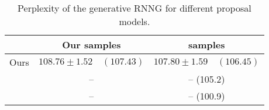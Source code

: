\begin{table}[h]
\center
\footnotesize
  \begin{tabular}{l|c|c}
        & Our samples & \citet{dyer2016rnng} samples \\ \hline
      Ours & $108.76 \pm	1.52 \quad (107.43)$ & $107.80 \pm 1.59 \quad (106.45)$  \\
      \citet{dyer2016rnng}  & -- & -- \quad (105.2)  \\
      \citet{kuncoro2017syntax} & -- & -- \quad (100.9)
  \end{tabular}
  \caption{Perplexity of the generative RNNG for different proposal models.}
  \label{tab:gen-perplexities}
\end{table}
